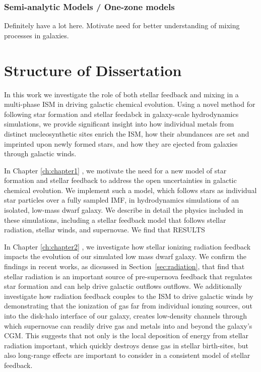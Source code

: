 \subsubsection{Semi-analytic Models / One-zone models}

Definitely have a lot here. Motivate need for better understanding of mixing processes in galaxies. \citep{SchonrichWeinberg2019}



%
%
%


\section{Structure of Dissertation}\label{sec:structure}

In this work we investigate the role of both stellar feedback and mixing in a multi-phase ISM in driving galactic chemical evolution. Using a novel method for following star formation and stellar feedabck in galaxy-scale hydrodynamics simulations, we provide significant insight into how individual metals from distinct nucleosynthetic sites enrich the ISM, how their abundances are set and imprinted upon newly formed stars, and how they are ejected from galaxies through galactic winds. 

In Chapter \ref{ch:chapter1} \citep[published as ][]{Emerick2019}, we motivate the need for a new model of star formation and stellar feedback to address the open uncertainties in galactic chemical evolution. We implement such a model, which follows stars as individual star particles over a fully sampled IMF, in hydrodynamics simulations of an isolated, low-mass dwarf galaxy. We describe in detail the physics included in these simulations, including a stellar feedback model that follows stellar radiation, stellar winds, and supernovae. We find that RESULTS

In Chapter \ref{ch:chapter2} \citep[published as ][]{Emerick2018a}, we investigate how stellar ionizing radiation feedback impacts the evolution of our simulated low mass dwarf galaxy. We confirm the findings in recent works, as dicsussed in Section~\ref{sec:radiation}, that find that stellar radiation is an important source of pre-supernova feedback that regulates star formation and can help drive galactic outflows outflows. We additionally investigate how radiation feedback couples to the ISM to drive galactic winds by demonstrating that the ionization of gas far from individual ionzing sources, out into the disk-halo interface of our galaxy, creates low-density channels through which supernovae can readily drive gas and metals into and beyond the galaxy's CGM. This suggests that not only is the local deposition of energy from stellar radiation important, which quickly destroys dense gas in stellar birth-sites, but also long-range effects are important to consider in a consistent model of stellar feedback.

